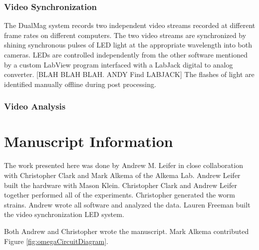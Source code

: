 \subsubsection{Video Synchronization}
The DualMag system records two independent video streams recorded at different frame rates on different computers. The two video streams are synchronized by shining synchronous pulses of LED light at the appropriate wavelength into both cameras. LEDs are controlled independently from the other software mentioned by a custom LabView program  interfaced with a LabJack digital to analog converter. [BLAH BLAH BLAH. ANDY Find LABJACK] The flashes of light are identified manually offline during post processing. 

\subsubsection{Video Analysis}





\section{Manuscript Information}
The work presented here was done by Andrew M. Leifer in close collaboration with Christopher Clark and Mark Alkema of the Alkema Lab. Andrew Leifer built the hardware with Mason Klein. Christopher Clark and Andrew Leifer together performed all of the experiments. Christopher generated the worm strains. Andrew wrote all software and analyzed the data. Lauren Freeman built the video synchronization LED system. 

Both Andrew and Christopher wrote the manuscript. Mark Alkema contributed Figure \ref{fig:omegaCircuitDiagram}.

